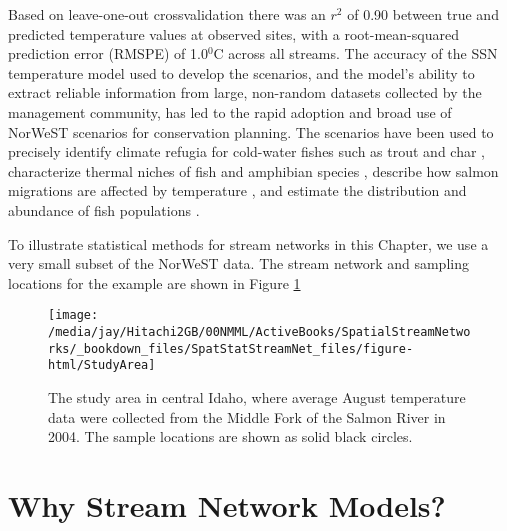 \documentclass[]{book}
\theoremstyle{definition}
\theoremstyle{definition}
\theoremstyle{definition}
\theoremstyle{remark}
\begin{document}
Based on leave-one-out crossvalidation there was an \(r^2\) of 0.90
between true and predicted temperature values at observed sites, with a
root-mean-squared prediction error (RMSPE) of 1.0\(^0\)C across all
streams. The accuracy of the SSN temperature model used to develop the
scenarios, and the model's ability to extract reliable information from
large, non-random datasets collected by the management community, has
led to the rapid adoption and broad use of NorWeST scenarios for
conservation planning. The scenarios have been used to precisely
identify climate refugia for cold-water fishes such as trout and char
\citep{Isaa:Youn:Nage:Hora:Groc:2015:cold, Isaa:Youn:Luce:Host:slow:2016},
characterize thermal niches of fish and amphibian species
\citep{Al:Schm:Clan:Saff:Kova:others:brow:2016, Isaa:Weng:Youn:big:2017},
describe how salmon migrations are affected by temperature
\citep{West:Ditt:Ward:Quin:sign:2015}, and estimate the distribution and
abundance of fish populations
\citep{Dauw:Fese:Bjor:Usin:2015, Isaa:Ver:Pete:Hora:Nage:scal:2017}.

To illustrate statistical methods for stream networks in this Chapter,
we use a very small subset of the NorWeST data. The stream network and
sampling locations for the example are shown in Figure
\ref{fig:Fig-StudyArea}

\begin{figure}[h]

{\centering \texttt{[image: /media/jay/Hitachi2GB/00NMML/ActiveBooks/SpatialStreamNetworks/\_bookdown\_files/SpatStatStreamNet\_files/figure-html/StudyArea]} 

}

\caption{The study area in central Idaho, where average August temperature data were collected from the Middle Fork of the Salmon River in 2004. The sample locations are shown as solid black circles.}\label{fig:Fig-StudyArea}
\end{figure}

\hypertarget{why-stream-network-models}{%
\section{Why Stream Network Models?}\label{why-stream-network-models}}
\end{document}

